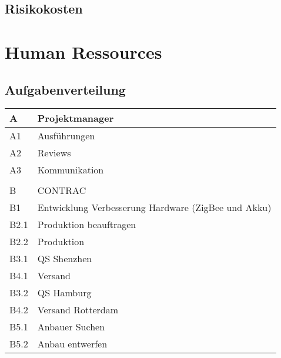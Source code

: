 \subsection{Risikokosten}


\section{Human Ressources}
\subsection{Aufgabenverteilung}
\begin{table}[H]
    \renewcommand{\arraystretch}{1.1}
    \begin{center}
        \begin{tabular}{l|l}
            \hline
            A    & Projektmanager                                      \\ \hline
            A1   & Ausführungen                                        \\ \hline
            A2   & Reviews                                             \\ \hline
            A3 & Kommunikation \\\hline
            &                                                   \\ \hline
            B    & CONTRAC                                             \\ \hline
            B1   & Entwicklung Verbesserung Hardware (ZigBee und Akku) \\ \hline
            B2.1 & Produktion beauftragen                              \\ \hline
            B2.2 & Produktion                                          \\ \hline
            B3.1 & QS Shenzhen                                         \\ \hline
            B4.1 & Versand                                             \\ \hline
            B3.2 & QS Hamburg                                          \\ \hline
            B4.2 & Versand Rotterdam                                   \\ \hline
            B5.1 & Anbauer Suchen                                      \\ \hline
            B5.2 & Anbau entwerfen                                     \\ \hline

\end{tabular}
\end{center}
\end{table}
